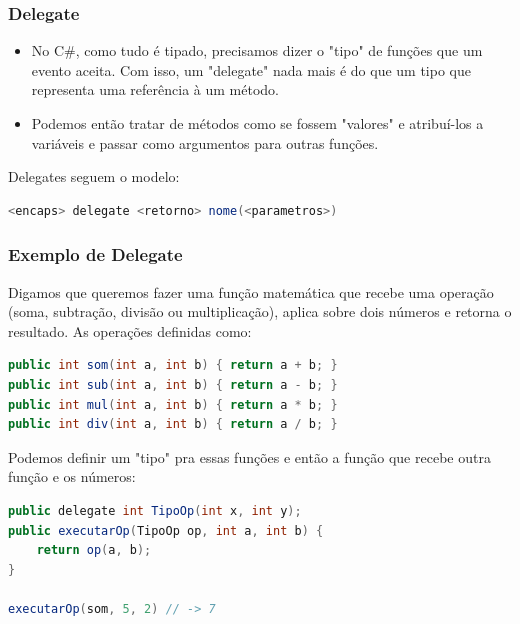 \documentclass{beamer}
\begin{document}
	\begin{frame}[fragile]
		\frametitle{Delegate}

		\begin{itemize}
			\item No C\#, como tudo é tipado, precisamos dizer o "tipo" de
				funções que um evento aceita. Com isso, um "delegate" nada mais
				é do que um tipo que representa uma referência à um método.

			\item Podemos então tratar de métodos como se fossem "valores" e
				atribuí-los a variáveis e passar como argumentos para outras
				funções.
		\end{itemize}

		Delegates seguem o modelo:
		\begin{lstlisting}[language=Java,basicstyle=\ttfamily,keywordstyle=\color{blue}]
<encaps> delegate <retorno> nome(<parametros>)
		\end{lstlisting}

	\end{frame}

	\begin{frame}[fragile]
		\frametitle{Exemplo de Delegate}

		Digamos que queremos fazer uma função matemática que recebe uma
		operação (soma, subtração, divisão ou multiplicação), aplica sobre dois
		números e retorna o resultado. As operações definidas como:

		\begin{lstlisting}[language=Java,basicstyle=\ttfamily,keywordstyle=\color{blue}]
public int som(int a, int b) { return a + b; }
public int sub(int a, int b) { return a - b; }
public int mul(int a, int b) { return a * b; }
public int div(int a, int b) { return a / b; }
		\end{lstlisting}

		Podemos definir um "tipo" pra essas funções e então a função que recebe
		outra função e os números:

		\begin{lstlisting}[language=Java,basicstyle=\ttfamily,keywordstyle=\color{blue}]
public delegate int TipoOp(int x, int y);
public executarOp(TipoOp op, int a, int b) {
	return op(a, b);
}

executarOp(som, 5, 2) // -> 7
		\end{lstlisting}

	\end{frame}
\end{document}
